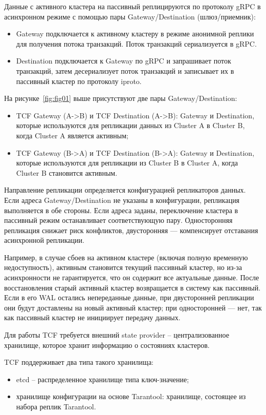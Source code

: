 Данные с активного кластера на пассивный реплицируются по протоколу gRPC в асинхронном режиме с помощью пары Gateway/Destination (шлюз/приемник):

\begin{itemize}
  \item Gateway подключается к активному кластеру в режиме анонимной реплики для получения потока
  транзакций. Поток транзакций сериализуется в gRPC.
  \item Destination подключается к Gateway по gRPC и запрашивает поток транзакций, затем десериализует
  поток транзакций и записывает их в пассивный кластер по протоколу iproto.
\end{itemize}

На рисунке~\ref{fig:fig01} выше присутствуют две пары Gateway/Destination:

\begin{itemize}
  \item TCF Gateway (A->B) и TCF Destination (A->B): Gateway и Destination, которые используются для
  репликации данных из Cluster A в Cluster B, когда Cluster A является активным;
  \item TCF Gateway (B->A) и TCF Destination (B->A): Gateway и Destination, которые используются для
  репликации из Cluster B в Cluster A, когда Cluster B становится активным.
\end{itemize}

Направление репликации определяется конфигурацией репликаторов данных. Если адреса Gateway/Destination не
указаны в конфигурации, репликация выполняется в обе стороны. Если адреса заданы, переключение кластера в
пассивный режим останавливает соответствующую пару. Односторонняя репликация снижает риск конфликтов,
двусторонняя — компенсирует отставания асинхронной репликации.

Например, в случае сбоев на активном кластере (включая полную временную недоступность), активным
становится текущий пассивный кластер, но из-за асинхронности не гарантируется, что он содержит все
актуальные данные. После восстановления старый активный кластер возвращается в систему как пассивный.
Если в его WAL остались непереданные данные, при двусторонней репликации они будут доставлены на новый
активный кластер; при односторонней — нет, так как пассивный кластер не инициирует передачу данных.

Для работы TCF требуется внешний state provider – централизованное хранилище, которое хранит информацию о
состояниях кластеров.

TCF поддерживает два типа такого хранилища:

\begin{itemize}
  \item etcd -- распределенное хранилище типа ключ-значение;
  \item хранилище конфигурации на основе Tarantool: хранилище, состоящее из набора реплик Tarantool.
\end{itemize}

